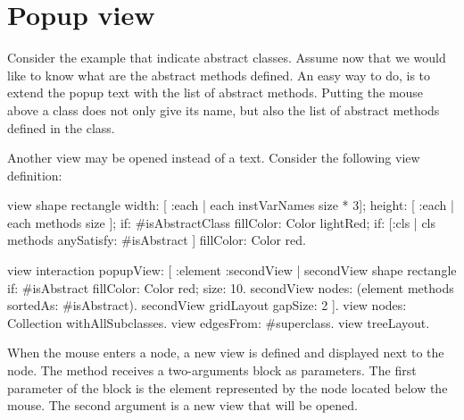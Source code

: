 \documentclass[a4paper,10pt,twoside]{book}
\begin{document}
\section{Popup view}

Consider the example that indicate abstract classes. Assume now that we would like to know what are the abstract methods defined. An easy way to do, is to extend the popup text with the list of abstract methods. Putting the mouse above a class does not only give its name, but also the list of abstract methods defined in the class.


Another view may be opened instead of a text. Consider the following view definition: 

\begin{code}{}
view shape rectangle
  width: [ :each | each instVarNames size * 3];
  height: [ :each | each methods size ];
  if: #isAbstractClass fillColor: Color lightRed;
  if: [:cls | cls methods anySatisfy: #isAbstract ] fillColor: Color red.
  
view interaction popupView: [ :element :secondView | 
  secondView shape rectangle 
    if: #isAbstract fillColor: Color red;
    size: 10.  
  secondView nodes: (element methods sortedAs: #isAbstract).
  secondView gridLayout gapSize: 2
  ].
view nodes: Collection withAllSubclasses.
view edgesFrom: #superclass.
view treeLayout.
\end{code}

When the mouse enters a node, a new view is defined and displayed next to the node. The method  receives a two-arguments block as parameters. The first parameter of the block is the element represented by the node located below the mouse. The second argument is a new view that will be opened.
\end{document}
